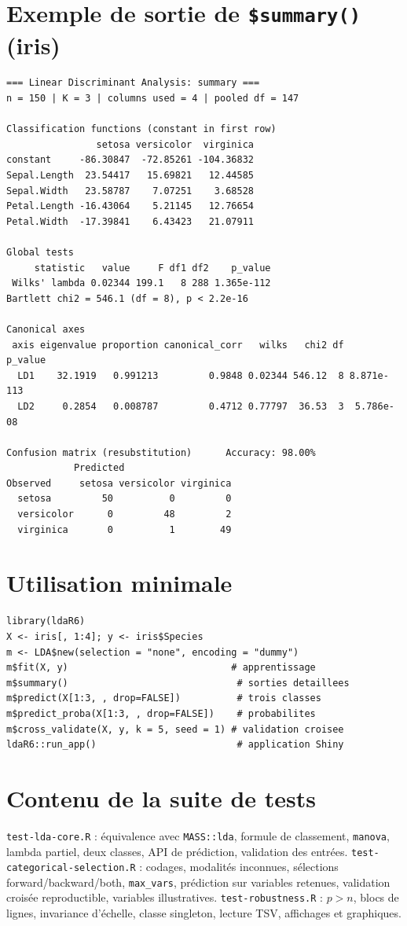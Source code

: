 \documentclass[10.5pt,a4paper]{article}
\newcommand{\code}[1]{\texttt{#1}}
\begin{document}
\section{Exemple de sortie de \code{\$summary()} (iris)}
\begin{small}
\begin{verbatim}
=== Linear Discriminant Analysis: summary ===
n = 150 | K = 3 | columns used = 4 | pooled df = 147

Classification functions (constant in first row)
                setosa versicolor  virginica
constant     -86.30847  -72.85261 -104.36832
Sepal.Length  23.54417   15.69821   12.44585
Sepal.Width   23.58787    7.07251    3.68528
Petal.Length -16.43064    5.21145   12.76654
Petal.Width  -17.39841    6.43423   21.07911

Global tests
     statistic   value     F df1 df2    p_value
 Wilks' lambda 0.02344 199.1   8 288 1.365e-112
Bartlett chi2 = 546.1 (df = 8), p < 2.2e-16

Canonical axes
 axis eigenvalue proportion canonical_corr   wilks   chi2 df    p_value
  LD1    32.1919   0.991213         0.9848 0.02344 546.12  8 8.871e-113
  LD2     0.2854   0.008787         0.4712 0.77797  36.53  3  5.786e-08

Confusion matrix (resubstitution)      Accuracy: 98.00%
            Predicted
Observed     setosa versicolor virginica
  setosa         50          0         0
  versicolor      0         48         2
  virginica       0          1        49
\end{verbatim}
\end{small}

\section{Utilisation minimale}
\begin{small}
\begin{verbatim}
library(ldaR6)
X <- iris[, 1:4]; y <- iris$Species
m <- LDA$new(selection = "none", encoding = "dummy")
m$fit(X, y)                             # apprentissage
m$summary()                              # sorties detaillees
m$predict(X[1:3, , drop=FALSE])          # trois classes
m$predict_proba(X[1:3, , drop=FALSE])    # probabilites
m$cross_validate(X, y, k = 5, seed = 1) # validation croisee
ldaR6::run_app()                         # application Shiny
\end{verbatim}
\end{small}

\section{Contenu de la suite de tests}
\code{test-lda-core.R} : \'equivalence avec \code{MASS::lda}, formule de classement, \code{manova}, lambda partiel, deux classes, API de pr\'ediction, validation des entr\'ees. \code{test-categorical-selection.R} : codages, modalit\'es inconnues, s\'elections forward/backward/both, \code{max\_vars}, pr\'ediction sur variables retenues, validation crois\'ee reproductible, variables illustratives. \code{test-robustness.R} : $p>n$, blocs de lignes, invariance d'\'echelle, classe singleton, lecture TSV, affichages et graphiques.
\end{document}
